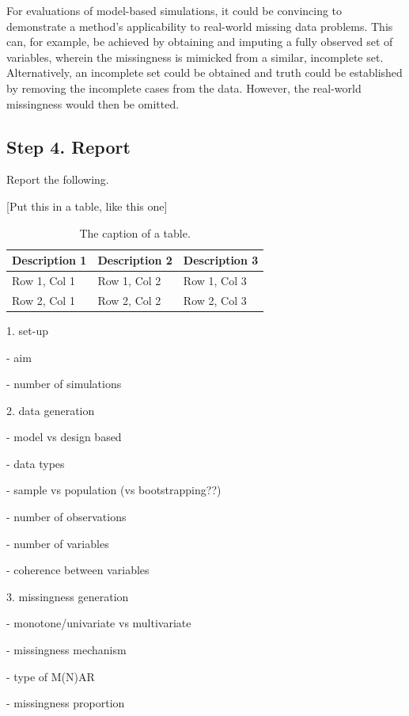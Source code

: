 \documentclass[bimj,fleqn]{w-art}
\begin{document}
For evaluations of model-based simulations, it could be convincing to demonstrate a method's applicability to real-world missing data problems. This can, for example, be achieved by obtaining and imputing a fully observed set of variables, wherein the missingness is mimicked from a similar, incomplete set. Alternatively, an incomplete set could be obtained and truth could be established by removing the incomplete cases from the data. However, the real-world missingness would then be omitted.


\subsection{Step 4. Report}

Report the following.

[Put this in a table, like this one]

\begin{table}[htb]
\begin{center}
\caption{The caption of a table.}
\begin{tabular}{lll}
\hline
Description 1 & Description 2 & Description 3\\
\hline
Row 1, Col 1 & Row 1, Col 2 & Row 1, Col 3\\
Row 2, Col 1 & Row 2, Col 2 & Row 2, Col 3\\
\hline
\end{tabular}
\end{center}
\end{table}

1. set-up

- aim

- number of simulations

2. data generation

- model vs design based

- data types

- sample vs population (vs bootstrapping??)

- number of observations

- number of variables

- coherence between variables


3. missingness generation

- monotone/univariate vs multivariate

- missingness mechanism

- type of M(N)AR

- missingness proportion 
\end{document}
